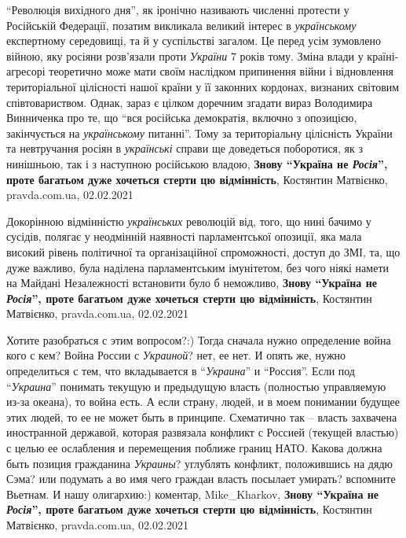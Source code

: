 \enquote{Революція вихідного дня}, як іронічно називають численні протести у Російській
Федерації, позатим викликала великий інтерес в \emph{українському} експертному
середовищі, та й у суспільстві загалом. Це перед усім зумовлено війною, яку
росіяни розв'язали проти \emph{України} 7 років тому. Зміна влади у країні-агресорі
теоретично може мати своїм наслідком припинення війни і відновлення
територіальної цілісності нашої країни у її законних кордонах, визнаних
світовим співтовариством. Однак, зараз є цілком доречним згадати вираз
Володимира Винниченка про те, що \enquote{вся російська демократія, включно з
опозицією, закінчується на \emph{українському} питанні}. Тому за територіальну
цілісність України та невтручання росіян в \emph{українські} справи ще доведеться
поборотися, як з нинішньою, так і з наступною російською владою,
\textbf{Знову \enquote{Україна не \emph{Росія}}, проте багатьом дуже хочеться стерти цю відмінність},
Костянтин Матвієнко, pravda.com.ua, 02.02.2021

Докорінною відмінністю \emph{українських} революцій від, того, що нині бачимо у
сусідів, полягає у неодмінній наявності парламентської опозиції, яка мала
високий рівень політичної та організаційної спроможності, доступ до ЗМІ, та, що
дуже важливо, була наділена парламентським імунітетом, без чого ніякі намети на
Майдані Незалежності встановити було б неможливо,
\textbf{Знову \enquote{Україна не \emph{Росія}}, проте багатьом дуже хочеться стерти цю відмінність},
Костянтин Матвієнко, pravda.com.ua, 02.02.2021

Хотите разобраться с этим вопросом?:) Тогда сначала нужно определение война
кого с кем? Война России с \emph{Украиной}? нет, ее нет. И опять же, нужно
определиться с тем, что вкладывается в \enquote{\emph{Украина}} и
\enquote{Россия}. Если под \enquote{\emph{Украина}} понимать текущую и
предыдущую власть (полностью управляемую из-за океана), то война есть. А если
страну, людей, и в моем понимании будущее этих людей, то ее не может быть в
принципе.  Схематично так – власть захвачена иностранной державой, которая
развязала конфликт с Россией (текущей властью) с целью ее ослабления и
перемещения поближе границ НАТО.  Какова должна быть позиция гражданина
\emph{Украины}? углублять конфликт, положившись на дядю Сэма? или подумать а во имя
чего граждан власть посылает умирать? вспомните Вьетнам. И нашу олигархию:)
коментар, Mike\_Kharkov, \textbf{Знову \enquote{Україна не \emph{Росія}}, проте багатьом дуже хочеться стерти цю відмінність},
Костянтин Матвієнко, pravda.com.ua, 02.02.2021

